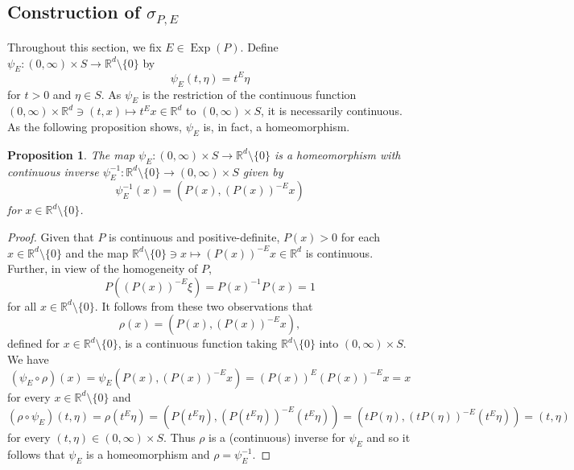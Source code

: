 \documentclass[11pt]{article}
\newtheorem{proposition}[theorem]{Proposition}
\newcommand\Exp{\operatorname{Exp}}
\begin{document}
\subsection{Construction of $\sigma_{P,E}$}\label{subsec:ConstructionofSigma}

Throughout this section, we fix $E\in\Exp(P)$. Define $\psi_E:(0,\infty)\times S\to\mathbb{R}^d\setminus\{0\}$ by
\begin{equation}\label{eq:Homeomorphism}
\psi_E(t,\eta)=t^E\eta
\end{equation}
for $t>0$ and $\eta\in S$. As $\psi_E$ is the restriction of the continuous function $(0,\infty)\times \mathbb{R}^d\ni (t,x)\mapsto t^E x\in\mathbb{R}^d$ to $(0,\infty)\times S$, it is necessarily continuous. As the following proposition shows, $\psi_E$ is, in fact, a homeomorphism.

\begin{proposition}\label{prop:PsiHomeomorphism}
The map $\psi_E:(0,\infty)\times S\to\mathbb{R}^d\setminus\{0\}$ is a homeomorphism with continuous inverse $\psi_E^{-1}:\mathbb{R}^d\setminus\{0\}\to (0,\infty)\times S$ given by
\begin{equation*}
\psi_E^{-1}(x)=(P(x),(P(x))^{-E}x)
\end{equation*}
for $x\in\mathbb{R}^d\setminus\{0\}$.
\end{proposition}

\begin{proof}
Given that $P$ is continuous and positive-definite, $P(x)>0$ for each $x\in \mathbb{R}^d\setminus\{0\}$ and the map $\mathbb{R}^d\setminus\{0\}\ni x \mapsto (P(x))^{-E}x\in \mathbb{R}^d$ is continuous. Further, in view of the homogeneity of $P$,
\begin{equation*}
P\left((P(x))^{-E}\xi\right)=P(x)^{-1}P(x)=1
\end{equation*}
for all $x\in\mathbb{R}^d\setminus\{0\}$. It follows from these two observations that
\begin{equation*}
\rho(x)=(P(x),(P(x))^{-E}x),
\end{equation*}
defined for $x\in\mathbb{R}^d\setminus\{0\}$, is a continuous function taking $\mathbb{R}^d\setminus\{0\}$ into $(0,\infty)\times S$. We have
\begin{equation*}
(\psi_E\circ \rho)(x)=\psi_E(P(x),(P(x))^{-E}x)=(P(x))^{E}(P(x))^{-E}x=x
\end{equation*}
for every $x\in \mathbb{R}^d\setminus \{0\}$ and
\begin{equation*}
(\rho\circ\psi_E)(t,\eta)=\rho(t^E\eta)=(P(t^{E}\eta),(P(t^{E}\eta))^{-E}(t^E\eta))=(tP(\eta),(tP(\eta))^{-E}(t^{E}\eta))=(t,\eta)
\end{equation*}
for every $(t,\eta)\in (0,\infty)\times S$. Thus $\rho$ is a (continuous) inverse for $\psi_E$ and so it follows that $\psi_E$ is a homeomorphism and $\rho=\psi_E^{-1}$.
\end{proof}
\end{document}
